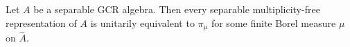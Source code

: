 Let $A$ be a separable GCR algebra. Then every separable multiplicity-free representation of $A$ is unitarily equivalent to $\pi_\mu$ for some finite Borel measure $\mu$ on $\hat{A}$.
